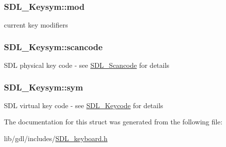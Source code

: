\subsubsection[{mod}]{ S\+D\+L\+\_\+\+Keysym\+::mod}\label{struct_s_d_l___keysym_ab519d1b8a9939d3d035f7103f3208291}
current key modifiers \hypertarget{struct_s_d_l___keysym_ad47e9120a511e2efc7ec0c6d8a5ec51e}{}
\subsubsection[{scancode}]{ S\+D\+L\+\_\+\+Keysym\+::scancode}\label{struct_s_d_l___keysym_ad47e9120a511e2efc7ec0c6d8a5ec51e}
S\+D\+L physical key code -\/ see \hyperlink{_s_d_l__scancode_8h_a82ab7cff701034fb40a47b5b3a02777b}{S\+D\+L\+\_\+\+Scancode} for details \hypertarget{struct_s_d_l___keysym_a082ff1fd787b79fa6c3a445deb225f08}{}
\subsubsection[{sym}]{ S\+D\+L\+\_\+\+Keysym\+::sym}\label{struct_s_d_l___keysym_a082ff1fd787b79fa6c3a445deb225f08}
S\+D\+L virtual key code -\/ see \hyperlink{_s_d_l__keycode_8h_ae9265f064f13f0f74dfca26a67875171}{S\+D\+L\+\_\+\+Keycode} for details 

The documentation for this struct was generated from the following file\+:\begin{DoxyCompactItemize}
\item 
lib/gdl/includes/\hyperlink{_s_d_l__keyboard_8h}{S\+D\+L\+\_\+keyboard.\+h}\end{DoxyCompactItemize}
